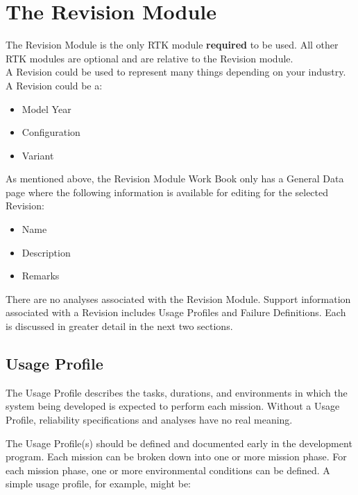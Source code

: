 \documentclass[twoside,12pt,letterpaper,openright]{book}
\begin{document}
\section{The Revision Module}

\noindent The Revision Module is the only RTK module \textbf{required} to be 
used.  All other RTK modules are optional and are relative to the Revision 
module.
\\

\noindent A Revision could be used to represent many things depending on your industry.  A Revision could be a:

\begin{itemize}
	\item {Model Year}
	\item {Configuration}
	\item {Variant}
\end{itemize}

\noindent As mentioned above, the Revision Module Work Book only has a General 
Data page where the following information is available for editing for the 
selected Revision:

\begin{itemize}
    \item Name
    \item Description
    \item Remarks
\end{itemize}

\noindent There are no analyses associated with the Revision Module.  Support
information associated with a Revision includes Usage Profiles and Failure
Definitions.  Each is discussed in greater detail in the next two sections.
\\

\subsection{Usage Profile}

\noindent The Usage Profile describes the tasks, durations, and environments in
which the system being developed is expected to perform each mission.  Without 
a Usage Profile, reliability specifications and analyses have no real meaning.


\noindent The Usage Profile(s) should be defined and documented early in the 
development program.  Each mission can be broken down into one or more mission 
phase.  For each mission phase, one or more environmental conditions can be 
defined.  A simple usage profile, for example, might be:
\\
\end{document}
